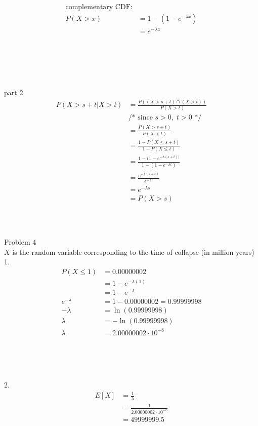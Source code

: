 \documentclass[12pt,border=4pt,multi]{article}%
\begin{document}
\begin{align*}
\text{complementary CDF:}\\
P(X > x) &= 1 - (1 - e^{-\lambda x})\\
&= e^{-\lambda x}\\
\end{align*}
\\
\\
\\
\\
\\
part 2\\
\begin{align*}
P(X > s + t| X > t) &= \frac{P((X > s + t) \cap (X > t))}{P(X > t)}\\
&\text{/* since } s > 0,\; t > 0 \text{ */}\\
&= \frac{P(X > s + t)}{P(X > t)}\\
&= \frac{1 - P(X \leq s + t)}{1 - P(X \leq t)}\\
&= \frac{1 - (1 - e^{-\lambda(s + t))}}{1 - (1 - e^{-\lambda t})}\\
&= \frac{e^{-\lambda(s + t)}}{e^{-\lambda t}}\\
&= e^{-\lambda s}\\
&= P(X > s)\\
\end{align*}
\\
\\
\\
\newpage
\noindent
Problem 4\\
$X$ is the random variable corresponding to the time of collapse (in million years)\\
1.
\begin{align*}
P(X \leq 1) &= 0.00000002\\
&= 1 - e^{-\lambda(1)}\\
&= 1 - e^{-\lambda}\\
e^{-\lambda} &= 1 - 0.00000002 = 0.99999998\\
-\lambda &= \ln(0.99999998)\\
\lambda &= -\ln(0.99999998)\\
\lambda &= \boxed{2.00000002 \cdot 10^{-8}}\\
\end{align*}
\\
\\
\\
\\
2.
\begin{align*}
E[X] &= \frac{1}{\lambda}\\
&= \frac{1}{2.00000002 \cdot 10^{-8}}\\
&= \boxed{49999999.5}\\
\end{align*}
\end{document}
